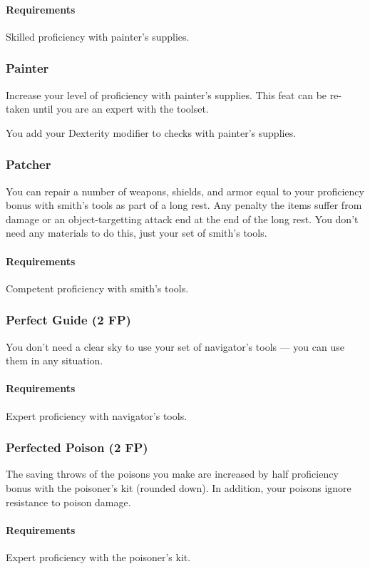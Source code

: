     \paragraph{Requirements} Skilled proficiency with painter's supplies.
\subsubsection{Painter} \label{feat::painter}
    Increase your level of proficiency with painter's supplies.
    This feat can be re-taken until you are an expert with the toolset.

    You add your Dexterity modifier to checks with painter's supplies.
\subsubsection{Patcher} \label{feat::patcher}
    You can repair a number of weapons, shields, and armor equal to your proficiency bonus with smith's tools as part of a long rest.
    Any penalty the items suffer from damage or an object-targetting attack end at the end of the long rest.
    You don't need any materials to do this, just your set of smith's tools.
    \paragraph{Requirements} Competent proficiency with smith's tools.
\subsubsection{Perfect Guide (2 FP)} \label{feat::perfectguide}
    You don't need a clear sky to use your set of navigator's tools --- you can use them in any situation.
    \paragraph{Requirements} Expert proficiency with navigator's tools.
\subsubsection{Perfected Poison (2 FP)} \label{feat::perfectedpoison}
    The saving throws of the poisons you make are increased by half proficiency bonus with the poisoner's kit (rounded down).
    In addition, your poisons ignore resistance to poison damage.
    \paragraph{Requirements} Expert proficiency with the poisoner's kit.
